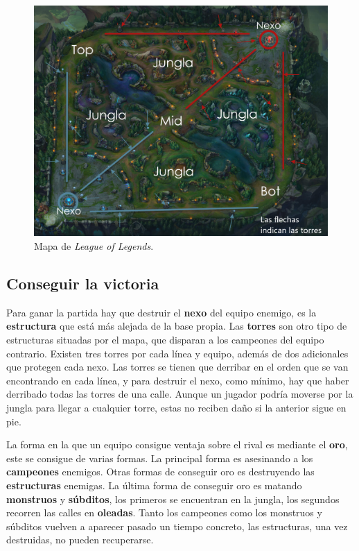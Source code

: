 \begin{figure}
	\centering
	\includegraphics[width=1\linewidth]{img/mapa-lol}
	\caption{Mapa de \textit{League of Legends}.}
	\label{fig:mapa-lol}
\end{figure}

\subsection{Conseguir la victoria}
Para ganar la partida hay que destruir el \textbf{nexo} del equipo enemigo, es la \textbf{estructura} que está más alejada de la base propia. Las \textbf{torres} son otro tipo de estructuras situadas por el mapa, que disparan a los campeones del equipo contrario. Existen tres torres por cada línea y equipo, además de dos adicionales que protegen cada nexo. Las torres se tienen que derribar en el orden que se van encontrando en cada línea, y para destruir el nexo, como mínimo, hay que haber derribado todas las torres de una calle. Aunque un jugador podría moverse por la jungla para llegar a cualquier torre, estas no reciben daño si la anterior sigue en pie.

La forma en la que un equipo consigue ventaja sobre el rival es mediante el \textbf{oro}, este se consigue de varias formas. La principal forma es asesinando a los \textbf{campeones} enemigos. Otras formas de conseguir oro es destruyendo las \textbf{estructuras} enemigas. La última forma de conseguir oro es matando \textbf{monstruos} y \textbf{súbditos}, los primeros se encuentran en la jungla, los segundos recorren las calles en \textbf{oleadas}. Tanto los campeones como los monstruos y súbditos vuelven a aparecer pasado un tiempo concreto, las estructuras, una vez destruidas, no pueden recuperarse.

